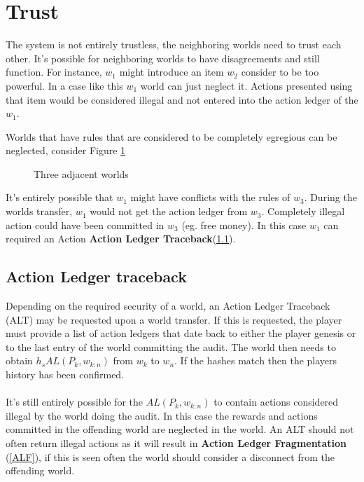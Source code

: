 \documentclass[runningheads,a4paper]{llncs}
\begin{document}

\section{Trust}
The system is not entirely trustless, the neighboring worlds need to trust each other. It's possible for neighboring worlds to have disagreements and still function. For instance, $w_1$ might introduce an item $w_2$ consider to be too powerful. In a case like this $w_1$ world can just neglect it. Actions presented using that item would be considered illegal and not entered into the action ledger of the $w_1$.

Worlds that have rules that are considered to be completely egregious can be neglected, consider Figure \ref{ThreeW} 

\begin{figure}
\caption{Three adjacent worlds}
\label{ThreeW}
\begin{center}
\end{center}
\end{figure}

It's entirely possible that $w_1$ might have conflicts with the rules of $w_3$. During the worlds transfer, $w_1$ would not get the action ledger from $w_3$. Completely illegal action could have been committed in $w_3$ (eg. free money). In this case $w_1$ can required an Action \textbf{Action Ledger Traceback}(\ref{ALT}).

\subsection{Action Ledger traceback}
\label{ALT}
Depending on the required security of a world, an Action Ledger Traceback (ALT) may be requested upon a world transfer. If this is requested, the player must provide a list of action ledgers that date back to either the player genesis or to the last entry of the world committing the audit. The world then needs to obtain $h_s{AL(P_k, w_{k:n})}$ from $w_k$ to $w_n$. If the hashes match then the players history has been confirmed. 
\\\\
It's still entirely possible for the $AL(P_k, w_{k:n})$ to contain actions considered illegal by the world doing the audit. In this case the rewards and actions committed in the offending world are neglected in the world. An ALT should not often return illegal actions as it will result in \textbf{Action Ledger Fragmentation} (\ref{ALF}), if this is seen often the world should consider a disconnect from the offending world. 
\end{document}
